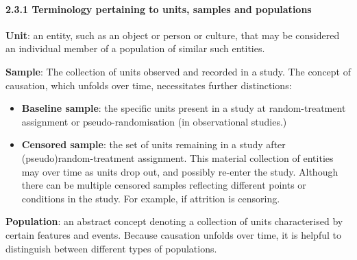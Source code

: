 \documentclass[
  singlecolumn]{article}
\let\oldparagraph\paragraph
\renewcommand{\paragraph}[1]{\oldparagraph{#1}\mbox{}}
\begin{document}
\paragraph{2.3.1 Terminology pertaining to units, samples and
populations}\label{terminology-pertaining-to-units-samples-and-populations}

\textbf{Unit}: an entity, such as an object or person or culture, that
may be considered an individual member of a population of similar such
entities.

\textbf{Sample}: The collection of units observed and recorded in a
study. The concept of causation, which unfolds over time, necessitates
further distinctions:

\begin{itemize}
\item
  \textbf{Baseline sample}: the specific units present in a study at
  random-treatment assignment or pseudo-randomisation (in observational
  studies.)
\item
  \textbf{Censored sample}: the set of units remaining in a study after
  (pseudo)random-treatment assignment. This material collection of
  entities may over time as units drop out, and possibly re-enter the
  study. Although there can be multiple censored samples reflecting
  different points or conditions in the study. For example, if attrition
  is censoring.
\end{itemize}

\textbf{Population}: an abstract concept denoting a collection of units
characterised by certain features and events. Because causation unfolds
over time, it is helpful to distinguish between different types of
populations.
\end{document}

